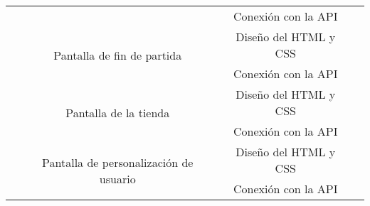 \documentclass[11pt, a4paper, titlepage]{article}
\begin{document}
\begin{landscape}
\begin{table}[hbt!]
\begin{tabular}{c|ccll|cc|}
\multicolumn{1}{|c|}{}                            & \multicolumn{1}{c|}{}                                                                                           & \multicolumn{3}{c|}{Conexión con la API}                                                                       & \multicolumn{2}{c|}{}                                                        \\ \cline{2-5}
\multicolumn{1}{|c|}{}                            & \multicolumn{1}{c|}{\multirow{2}{*}{Pantalla de fin de partida}}                                                & \multicolumn{3}{c|}{Diseño del HTML y CSS}                                                                     & \multicolumn{2}{c|}{}                                                        \\ \cline{3-5}
\multicolumn{1}{|c|}{}                            & \multicolumn{1}{c|}{}                                                                                           & \multicolumn{3}{c|}{Conexión con la API}                                                                       & \multicolumn{2}{c|}{}                                                        \\ \cline{2-5}
\multicolumn{1}{|c|}{}                            & \multicolumn{1}{c|}{\multirow{2}{*}{Pantalla de la tienda}}                                                     & \multicolumn{3}{c|}{Diseño del HTML y CSS}                                                                     & \multicolumn{2}{c|}{}                                                        \\ \cline{3-5}
\multicolumn{1}{|c|}{}                            & \multicolumn{1}{c|}{}                                                                                           & \multicolumn{3}{c|}{Conexión con la API}                                                                       & \multicolumn{2}{c|}{}                                                        \\ \cline{2-5}
\multicolumn{1}{|c|}{}                            & \multicolumn{1}{c|}{\multirow{2}{*}{Pantalla de personalización de usuario}}                                    & \multicolumn{3}{c|}{Diseño del HTML y CSS}                                                                     & \multicolumn{2}{c|}{}                                                        \\ \cline{3-5}
\multicolumn{1}{|c|}{}                            & \multicolumn{1}{c|}{}                                                                                           & \multicolumn{3}{c|}{Conexión con la API}                                                                       & \multicolumn{2}{c|}{}                                                        \\ \cline{2-5}

\end{tabular}
\end{table}
\end{landscape}
\end{document}
